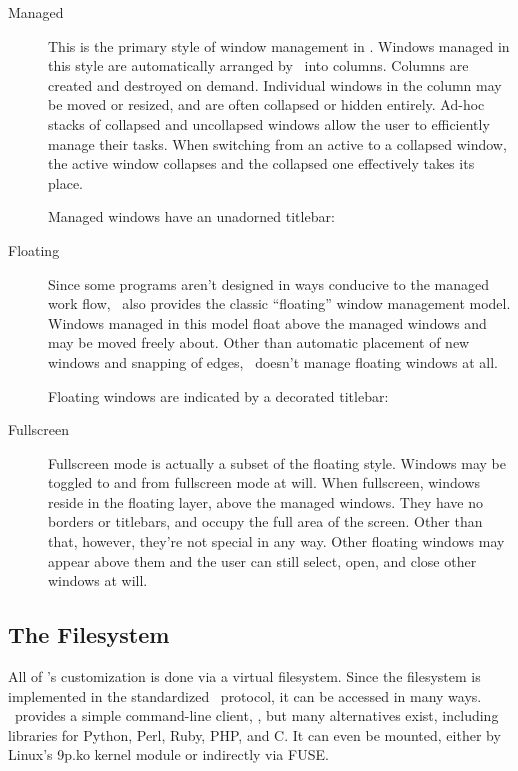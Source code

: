 \begin{description}
  \item[Managed] This is the primary style of window management
    in \wmii. Windows managed in this style are automatically
    arranged by \wmii\ into columns. Columns are created and
    destroyed on demand. Individual windows in the column may be
    moved or resized, and are often collapsed or hidden
    entirely. Ad-hoc stacks of collapsed and uncollapsed windows
    allow the user to efficiently manage their tasks. When
    switching from an active to a collapsed window, the active
    window collapses and the collapsed one effectively takes
    its place.

    Managed windows have an unadorned titlebar:


  \item[Floating] Since some programs aren't designed in ways
    conducive to the managed work flow, \wmii\ also provides the
    classic “floating” window management model. Windows managed
    in this model float above the managed windows and may be moved
    freely about. Other than automatic placement of new windows
    and snapping of edges, \wmii\ doesn't manage floating
    windows at all.

    Floating windows are indicated by a decorated titlebar:


  \item[Fullscreen] Fullscreen mode is actually a subset of the
    floating style. Windows may be toggled to and from
    fullscreen mode at will. When fullscreen, windows reside in
    the floating layer, above the managed windows. They have no
    borders or titlebars, and occupy the full area of the
    screen. Other than that, however, they're not special in any
    way. Other floating windows may appear above them and the
    user can still select, open, and close other windows at
    will.
\end{description}

\subsection{The Filesystem}

All of \wmii's customization is done via a virtual filesystem.
Since the filesystem is implemented in the standardized \ninep\
protocol, it can be accessed in many ways. \wmii\ provides a
simple command-line client, \wmiir, but many alternatives exist,
including libraries for Python, Perl, Ruby, PHP, and C. It can
even be mounted, either by Linux's 9p.ko kernel module or
indirectly via FUSE.

